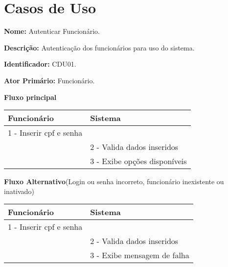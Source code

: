 \section{Casos de Uso}\label{casosdeuso}

\par
\textbf{Nome:} Autenticar Funcionário. 
\par
\textbf{Descrição:} Autenticação dos funcionários para uso do sistema.
\par 
\textbf{Identificador:} CDU01.
\par
\textbf{Ator Primário:} Funcionário.	
\par
\par
\textbf{Fluxo principal}\par
\begin{tabular}{|p{7cm}|p{7cm}|}
	\hline 
	Funcionário & Sistema \\ 
	\hline 
	1 - Inserir cpf e senha  &  \\ 
	\hline 
	& 
	
	2 - Valida dados inseridos 
	\\ 
	\hline 
	& 
	
	3 - Exibe opções disponíveis
	\\ 
	\hline 
\end{tabular} 
\vspace{12px}
\par
\textbf{Fluxo Alternativo}(Login ou senha incorreto, funcionário inexistente ou inativado)\par
\begin{tabular}{|p{7cm}|p{7cm}|}
	\hline 
	Funcionário & Sistema \\ 
	\hline 
	1 - Inserir cpf e senha  &  \\ 
	\hline 
	& 
	
	2 - Valida dados inseridos 
	\\ 
	\hline 
	& 
	
	3 - Exibe mensagem de falha		
	\\ 
	\hline 
\end{tabular} 
\vspace{12px}


